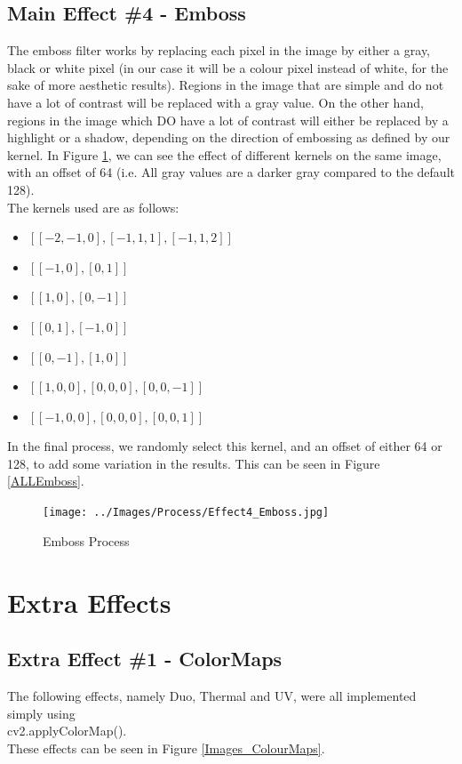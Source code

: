 \documentclass[a4paper,10pt]{report}
\begin{document}
	\subsection{Main Effect \#4 - Emboss}
	The emboss filter works by replacing each pixel in the image by either a gray, black or white pixel (in our case it will be a colour pixel instead of white, for the sake of more aesthetic results). Regions in the image that are simple and do not have a lot of contrast will be replaced with a gray value. On the other hand, regions in the image which DO have a lot of contrast will either be replaced by a highlight or a shadow, depending on the direction of embossing as defined by our kernel. In Figure \ref{Process_Emboss}, we can see the effect of different kernels on the same image, with an offset of 64 (i.e. All gray values are a darker gray compared to the default 128). \\
	The kernels used are as follows: 
	\begin{itemize}
		\item $[[-2,-1,0],[-1,1,1],[-1,1,2]]$
		\item $[[-1, 0], [0, 1]]$
		\item $[[1,0],[0,-1]]$
		\item $[[0,1],[-1,0]]$
		\item $[[0,-1],[1,0]]$
		\item $[[1,0,0],[0,0,0],[0,0,-1]]$
		\item $[[-1,0,0],[0,0,0],[0,0,1]]$
	\end{itemize}
	In the final process, we randomly select this kernel, and an offset of either 64 or 128, to add some variation in the results. This can be seen in Figure \ref{ALLEmboss}.
	\begin{figure}[h]
		\caption{Emboss Process}
		\centering
		\texttt{[image: ../Images/Process/Effect4\_Emboss.jpg]}
		\label{Process_Emboss}
	\end{figure}
	
	
	\section{Extra Effects}\label{ExtraEffectsChapter}
	\subsection{Extra Effect \#1 - ColorMaps}
	The following effects, namely Duo, Thermal and UV, were all implemented simply using \\cv2.applyColorMap().\\
	These effects can be seen in Figure \ref{Images_ColourMaps}.
\end{document}
